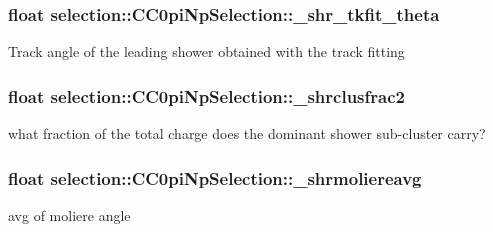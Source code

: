 \subsubsection[{\texorpdfstring{\+\_\+shr\+\_\+tkfit\+\_\+theta}{_shr_tkfit_theta}}]{\setlength{\rightskip}{0pt plus 5cm}float selection\+::\+C\+C0pi\+Np\+Selection\+::\+\_\+shr\+\_\+tkfit\+\_\+theta\hspace{0.3cm}{\ttfamily [private]}}\hypertarget{classselection_1_1CC0piNpSelection_a11df391e482434665c389423bbb9ec5d}{}\label{classselection_1_1CC0piNpSelection_a11df391e482434665c389423bbb9ec5d}
Track angle of the leading shower obtained with the track fitting 
\subsubsection[{\texorpdfstring{\+\_\+shrclusfrac2}{_shrclusfrac2}}]{\setlength{\rightskip}{0pt plus 5cm}float selection\+::\+C\+C0pi\+Np\+Selection\+::\+\_\+shrclusfrac2\hspace{0.3cm}{\ttfamily [private]}}\hypertarget{classselection_1_1CC0piNpSelection_acf870c688a80fa995ed5c6245fa02608}{}\label{classselection_1_1CC0piNpSelection_acf870c688a80fa995ed5c6245fa02608}
what fraction of the total charge does the dominant shower sub-\/cluster carry? 
\subsubsection[{\texorpdfstring{\+\_\+shrmoliereavg}{_shrmoliereavg}}]{\setlength{\rightskip}{0pt plus 5cm}float selection\+::\+C\+C0pi\+Np\+Selection\+::\+\_\+shrmoliereavg\hspace{0.3cm}{\ttfamily [private]}}\hypertarget{classselection_1_1CC0piNpSelection_a12991c5dfa675422d48f75a1caeae3ea}{}\label{classselection_1_1CC0piNpSelection_a12991c5dfa675422d48f75a1caeae3ea}
avg of moliere angle 
